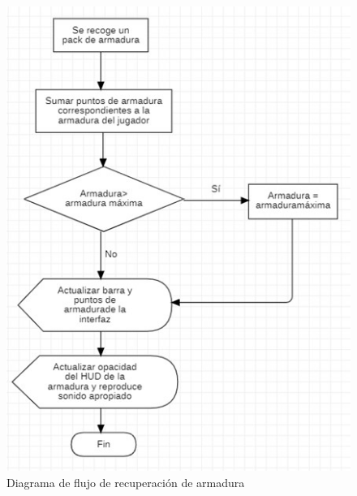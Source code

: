\begin{figure}[h]
    \centering
    \includegraphics[scale=0.5]{img/ArmorRecoveryFlowchart.jpg}
    \caption{Diagrama de flujo de recuperación de armadura}
    \label{fig:DiagramaArmadura}
    \end{figure}
    
